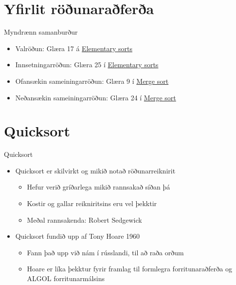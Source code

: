 \documentclass{beamer}
\begin{document}
\section{Yfirlit röðunaraðferða}

\begin{frame}{Myndrænn samanburður}
\begin{itemize}
 \item Valröðun: Glæra 17 á \href{http://algs4.cs.princeton.edu/lectures/21ElementarySorts.pdf}{Elementary sorts}
 \item Innsetningarröðun: Glæra 25 í \href{http://algs4.cs.princeton.edu/lectures/22Mergesort.pdf}{Elementary sorts}
 \item Ofansækin sameiningarröðun: Glæra 9 í \href{http://algs4.cs.princeton.edu/lectures/22Mergesort.pdf}{Merge sort}
 \item Neðansækin sameiningarröðun: Glæra 24 í \href{http://algs4.cs.princeton.edu/lectures/22Mergesort.pdf}{Merge sort}
\end{itemize}
\end{frame}

\section{Quicksort}

\begin{frame}{Quicksort}
\begin{itemize}
 \item Quicksort er skilvirkt og mikið notað röðunarreiknirit
 \begin{itemize}
  \item Hefur verið gríðarlega mikið rannsakað síðan þá
  \item Kostir og gallar reikniritsins eru vel þekktir
  \item Meðal rannsakenda: Robert Sedgewick
 \end{itemize}
\item Quicksort fundið upp af Tony Hoare 1960
 \begin{itemize}
  \item Fann það upp við nám í rússlandi, til að raða orðum 
  \item Hoare er líka þekktur fyrir framlag til formlegra forritunaraðferða og ALGOL forritunarmálsins
 \end{itemize}
\end{itemize}
\end{frame}
\end{document}
